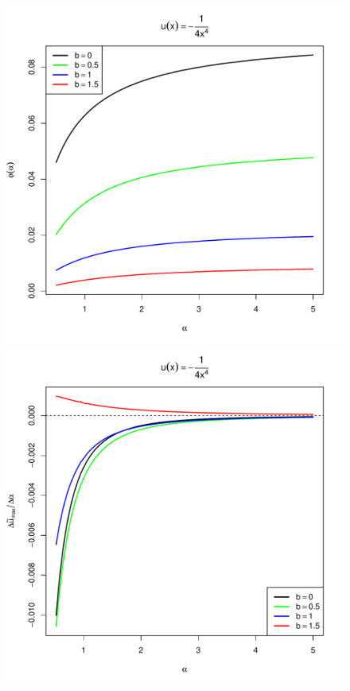 \documentclass{beamer}
\begin{document}
\begin{frame}
\begin{minipage}[t]{0.5\linewidth}
\begin{figure}[htb!]
\begin{minipage}{0.5\linewidth}
      \end{minipage}
      \begin{minipage}{0.5\linewidth}
        \includegraphics[width=\textwidth]{phi_hat_b_t_power4.pdf}
      \end{minipage}\hfill
      \begin{minipage}{0.5\linewidth}
        \includegraphics[width=\textwidth]{U_b_t_power4.pdf}

\end{minipage}
\end{figure}
\end{minipage}
\end{frame}
\end{document}
